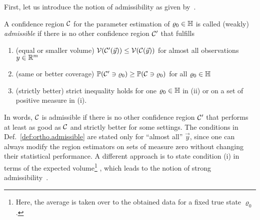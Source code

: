 
First, let us introduce the notion of admissibility as given by~\cite[Def. 2.2]{Joshi_1969_Admissibility}.
\begin{definition}\label{def:ortho.admissible}
  A confidence region $\mathcal{C}$ for the parameter estimation of $\varrho_0 \in \mathbb{H}$ is called (weakly) \emph{admissible} if there is no other confidence region $\mathcal{C}'$ that fulfills
  \begin{enumerate}
    \item(equal or smaller volume) $\mathcal{V}(\mathcal{C}'(\vec y)) \le \mathcal{V}(\mathcal{C}(\vec y))$ for almost all observations $y \in \mathbb{R}^m$
    \item(same or better coverage) $\mathbb{P}(\mathcal{C}' \owns \varrho_0) \ge \mathbb{P}(\mathcal{C} \owns \varrho_0)$ for all $\varrho_0 \in \mathbb{H}$
    \item(strictly better) strict inequality holds for one $\varrho_0 \in \mathbb{H}$ in (ii) or on a set of positive measure in (i).
  \end{enumerate}
\end{definition}
In words, $\mathcal{C}$ is admissible if there is no other confidence region $\mathcal{C}'$ that performs at least as good as $\mathcal{C}$ and strictly better for some settings.
The conditions in Def.~\ref{def:ortho.admissible} are stated only for ``almost all'' $\vec y$, since one can always modify the region estimators on sets of measure zero without changing their statistical performance.
A different approach is to state condition (i) in terms of the expected volume\footnote{%
  Here, the average is taken over to the obtained data for a fixed true state $\varrho_0$.
}
, which leads to the notion of strong admissibility~\cite[Def.~7.1]{Joshi_1969_Admissibility}.




